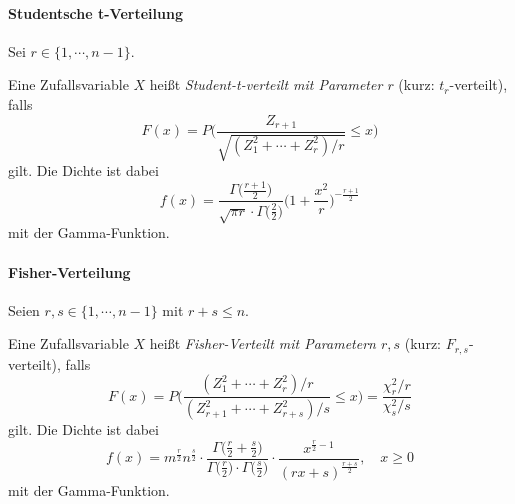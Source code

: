 \documentclass[a4paper, 11pt, accentcolor = tud3b]{tudreport}
\begin{document}
                    \paragraph{Studentsche t-Verteilung}
                        Sei \( r \in \{ 1, \cdots, n - 1 \} \).
                        
                        Eine Zufallsvariable \(X\) heißt \textit{Student-t-verteilt mit Parameter \(r\)} (kurz: \( t_r \)-verteilt), falls
                        \begin{equation*}
	                        F(x) = P\Bigg( \frac{Z_{r+1}}{\sqrt{(Z_1^2 + \cdots + Z_r^2) / r}} \leq x \Bigg)
                        \end{equation*}
                        gilt. Die Dichte ist dabei
                        \begin{equation*}
	                        f(x) = \frac{\Gamma\big(\frac{r + 1}{2}\big)}{\sqrt{\pi r} \cdot \Gamma\big(\frac{2}{2}\big)} \Bigg(1 + \frac{x^2}{r}\Bigg) ^ { -\frac{r+1}{2} }
                        \end{equation*}
                        mit der Gamma-Funktion.

                    \paragraph{Fisher-Verteilung}
                        Seien \( r, s \in \{ 1, \cdots, n - 1 \} \) mit \( r + s \leq n \).
                        
                        Eine Zufallsvariable \(X\) heißt \textit{Fisher-Verteilt mit Parametern \( r, s \)} (kurz: \(F_{r,s}\)-verteilt), falls
                        \begin{equation*}
	                        F(x) = P\Bigg( \frac{(Z_1^2 + \cdots + Z_r^2) / r}{(Z_{r+1}^2 + \cdots + Z_{r+s}^2) / s} \leq x \Bigg) = \frac{\chi_r^2 / r}{\chi_s^2 / s}
                        \end{equation*}
                        gilt. Die Dichte ist dabei
                        \begin{equation*}
	                        f(x) = m^{\frac{r}{2}} n^{\frac{s}{2}} \cdot \frac{\Gamma\big( \frac{r}{2} + \frac{s}{2} \big)}{\Gamma\big( \frac{r}{2} \big) \cdot \Gamma\big( \frac{s}{2} \big)} \cdot \frac{x^{ \frac{r}{2} - 1 }}{(rx + s)^{\frac{r + s}{2}}}, \quad x \geq 0
                        \end{equation*}
                        mit der Gamma-Funktion.
\end{document}
